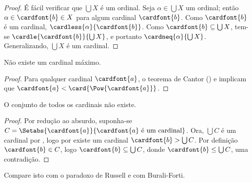 \documentclass[../../../include/open-logic-section]{subfiles}
\begin{document}
\begin{proof}
É fácil verificar que $\bigcup X$ é um ordinal. Seja $\alpha \in
\bigcup X$ um ordinal; então $\alpha \in \cardfont{b} \in X$ para
algum cardinal $\cardfont{b}$. Como $\cardfont{b}$ é um cardinal,
$\cardless{\alpha}{\cardfont{b}}$. Como $\cardfont{b} \subseteq
\bigcup X$, tem-se $\cardle{\cardfont{b}}{\bigcup X}$, e portanto
$\cardneq{\alpha}{\bigcup X}$. Generalizando, $\bigcup X$ é um
cardinal.
\end{proof}

\begin{thm}
Não existe um cardinal máximo.
\end{thm}

\begin{proof}
Para qualquer cardinal $\cardfont{a}$, o teorema de Cantor
() e
 implicam que
$\cardfont{a} < \card{\Pow{\cardfont{a}}}$.
\end{proof}

\begin{thm}
O conjunto de todos os cardinais não existe.
\end{thm}

\begin{proof}
Por redução ao absurdo, suponha-se $C = \Setabs{\cardfont{a}}{\cardfont{a} \text{
é um cardinal}}$. Ora, $\bigcup C$ é um cardinal por
, logo por 
existe um cardinal $\cardfont{b} > \bigcup C$. Por definição
$\cardfont{b} \in C$, logo $\cardfont{b} \subseteq \bigcup{C}$, donde
$\cardfont{b} \leq \bigcup C$, uma contradição.
\end{proof}

Compare isto com o paradoxo de Russell e com Burali-Forti.
\end{document}
